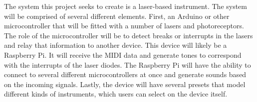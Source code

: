 The system this project seeks to create is a laser-based instrument. The system will be comprised of several different elements. First, an Arduino or other microcontroller that will be fitted with a number of lasers and photoreceptors. The role of the microcontroller will be to detect breaks or interrupts in the lasers and relay that information to another device. This device will likely be a Raspberry Pi. It will receive the MIDI data and generate tones to correspond with the interrupts of the laser diodes. The Raspberry Pi will have the ability to connect to several different microcontrollers at once and generate sounds based on the incoming signals. Lastly, the device will have several presets that model different kinds of instruments, which users can select on the device itself.
